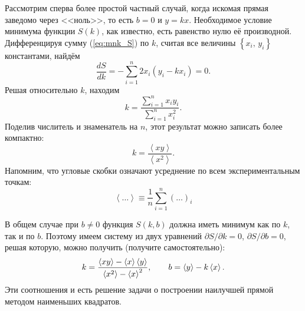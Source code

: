 Рассмотрим сперва более простой частный случай, когда искомая прямая
заведомо через <<ноль>>, то есть $b=0$ и $y=kx$.
Необходимое условие минимума функции $S\left(k\right)$, как известно,
есть равенство нулю её производной. Дифференцируя сумму (\ref{eq:mnk_S})
по $k$, считая все величины $\left\{ x_{i},\,y_{i}\right\} $ константами,
найдём
\[
\frac{dS}{dk}=-\sum\limits _{i=1}^{n}2x_{i}\left(y_{i}-kx_{i}\right)=0.
\]
Решая относительно $k$, находим
\[
k=\frac{\sum\limits _{i=1}^{n}x_{i}y_{i}}{\sum\limits _{i=1}^{n}x_{i}^{2}}.
\]
Поделив числитель и знаменатель на $n$, этот результат можно записать
более компактно:
\begin{equation}
k=\frac{\left\langle xy\right\rangle }{\left\langle x^{2}\right\rangle}.
\label{eq:MNK0}
\end{equation}
Напомним, что угловые скобки означают усреднение по всем экспериментальным точкам:
\[
\left\langle \ldots\right\rangle \equiv\frac{1}{n}\sum\limits
_{i=1}^{n}\left(\ldots\right)_{i}
\]

В общем случае при $b\ne0$ функция $S\left(k,b\right)$ должна иметь
минимум как по $k$, так и по $b$. Поэтому имеем систему из двух
уравнений $\partial S/\partial k=0$, $\partial S/\partial b=0$,
решая которую, можно получить (получите самостоятельно):
\begin{equation}
    k=\frac{\average{xy}-\average{x}\average{y}}%
        {\average{x^{2}}-\average{x}^2},\qquad
        b=\average{y}-k\average{x}.\label{eq:MNK}
\end{equation}
Эти соотношения и есть решение задачи о построении наилучшей прямой
методом наименьших квадратов.



